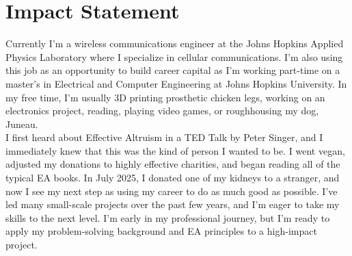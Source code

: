 \documentclass[10pt, letterpaper]{article}
\newenvironment{onecolentry}{
    \begin{adjustwidth}{0.2 cm}{0.2 cm}
}{
    \end{adjustwidth}
}
\begin{document}
    \section{Impact Statement}
        \begin{onecolentry}
            Currently I'm a wireless communications engineer at the Johns Hopkins Applied Physics Laboratory where I specialize in cellular communications. 
            I'm also using this job as an opportunity to build career capital as I'm working part-time on a master's in Electrical and Computer Engineering at
            Johns Hopkins University. In my free time, I'm usually 3D printing prosthetic chicken legs, working on an electronics project, reading, playing video games, or roughhousing
            my dog, Juneau. \\
            I first heard about Effective Altruism in a TED Talk by Peter Singer, and I immediately knew that this was the kind of person I wanted to be. I went vegan, 
            adjusted my donations to highly effective charities, and began reading all of the typical EA books. In July 2025, I donated one of my kidneys to a 
            stranger, and now I see my next step as using my career to do as much good as possible.  
            I've led many small-scale projects over the past few years, and I'm eager to take my skills to the next level.
            I'm early in my professional journey, but I'm ready to apply my problem-solving background and EA principles to a high-impact project.
        \end{onecolentry}

    \vspace{0.3 cm - 0.3 cm}
\end{document}
